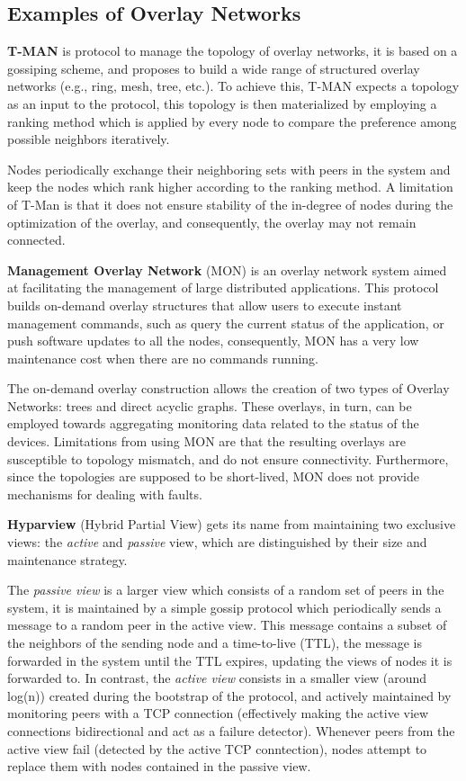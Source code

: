 \subsection{Examples of Overlay Networks}

\textbf{T-MAN} \cite{t-man} is protocol to manage the topology of overlay networks, it is based on a gossiping scheme, and proposes to build a wide range of structured overlay networks (e.g., ring, mesh, tree, etc.). To achieve this, T-MAN expects a topology as an input to the protocol, this topology is then materialized by employing a ranking method which is applied by every node to compare the preference among possible neighbors iteratively. 

Nodes periodically exchange their neighboring sets with peers in the system and keep the nodes which rank higher according to the ranking method. A limitation of T-Man is that it does not ensure stability of the in-degree of nodes during the optimization of the overlay, and consequently, the overlay may not remain connected. 

\textbf{Management Overlay Network} \cite{liang2005mon} (MON) is an overlay network system aimed at facilitating the management of large distributed applications. This protocol builds on-demand overlay structures that allow users to execute instant management commands, such as query the current status of the application, or push software updates to all the nodes, consequently, MON has a very low maintenance cost when there are no commands running.

The on-demand overlay construction allows the creation of two types of Overlay Networks: trees and direct acyclic graphs. These overlays, in turn, can be employed towards aggregating monitoring data related to the status of the devices. Limitations from using MON are that the resulting overlays are susceptible to topology mismatch, and do not ensure connectivity. Furthermore, since the topologies are supposed to be short-lived, MON does not provide mechanisms for dealing with faults.

\textbf{Hyparview} \cite{Hyparview} (Hybrid Partial View) gets its name from maintaining two exclusive views: the \textit{active} and \textit{passive} view, which are distinguished by their size and maintenance strategy. 

The \textit{passive view} is a larger view which consists of a random set of peers in the system, it is maintained by a simple gossip protocol which periodically sends a message to a random peer in the active view. This message contains a subset of the neighbors of the sending node and a time-to-live (TTL), the message is forwarded in the system until the TTL expires, updating the views of nodes it is forwarded to. In contrast, the \textit{active view} consists in a smaller view (around log(n)) created during the bootstrap of the protocol, and actively maintained by monitoring peers with a TCP connection (effectively making the active view connections bidirectional and act as a failure detector). Whenever peers from the active view fail (detected by the active TCP conntection), nodes attempt to replace them with nodes contained in the passive view.

